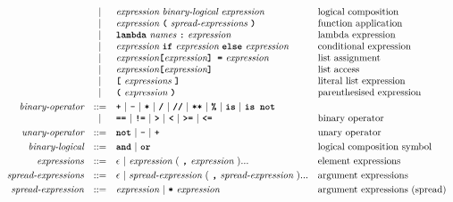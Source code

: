 \[\begin{array}{rcll}
                            & |   & \textit{expression}\ \textit{binary-logical}\ \textit{expression}                        & \text{logical composition}              \\
                            & |   & \textit{expression}\ \textbf{\texttt{(}}\ \textit{spread-expressions}\ \textbf{\texttt{)}}                     & \text{function application}             \\
                            & |   & \textbf{\texttt{lambda}}\ \textit{names}\ \textbf{\texttt{:}}\ \textit{expression}         & \text{lambda expression}                \\
                            & |   & \textit{expression}\ \textbf{\texttt{if}}\ \textit{expression}\ \textbf{\texttt{else}}\ \textit{expression}    & \text{conditional expression}           \\
                            & |   & \textit{expression}\textbf{\texttt{[}}\textit{expression}\textbf{\texttt{] =}}\ \textit{expression}            & \text{list assignment}                  \\
                            & |   & \textit{expression}\textbf{\texttt{[}}\textit{expression}\textbf{\texttt{]}}                                   & \text{list access}                      \\
                            & |   & \textbf{\texttt{[}}\ \textit{expressions}\ \textbf{\texttt{]}}                                                 & \text{literal list expression}          \\
                            & |   & \textbf{\texttt{(}}\ \textit{expression}\ \textbf{\texttt{)}}                                                  & \text{parenthesised expression}         \\[1mm]
\textit{binary-operator}    & ::= & \textbf{\texttt{+}}\ |\ \textbf{\texttt{-}}\ |\ \textbf{\texttt{*}}\ |\ \textbf{\texttt{/}}\ |\ \textbf{\texttt{//}}\ |\ \textbf{\texttt{**}}\ |\ \textbf{\texttt{\%}}\ |\ \textbf{\texttt{is}}\ |\ \textbf{\texttt{is not}} &                                         \\
                            & |   & \textbf{\texttt{==}}\ |\ \textbf{\texttt{!=}}\ |\ \textbf{\texttt{>}}\ |\ \textbf{\texttt{<}}\ |\ \textbf{\texttt{>=}}\ |\ \textbf{\texttt{<=}}            & \text{binary operator}                  \\[1mm]
\textit{unary-operator}     & ::= & \textbf{\texttt{not}}\ |\ \textbf{\texttt{-}}\ |\ \textbf{\texttt{+}}                                                     & \text{unary operator}                   \\[1mm]
\textit{binary-logical}     & ::= & \textbf{\texttt{and}}\ |\ \textbf{\texttt{or}}                                                                 & \text{logical composition symbol}       \\[1mm]
\textit{expressions}        & ::= & \epsilon\ |\ \textit{expression}\ (\ \textbf{\texttt{,}}\ \textit{expression}\ )...                 & \text{element expressions}              \\[1mm]
\textit{spread-expressions} & ::= & \epsilon\ |\ \textit{spread-expression}\ (\ \textbf{\texttt{,}}\ \textit{spread-expression}\ )...   & \text{argument expressions}             \\[1mm]
\textit{spread-expression}  & ::= & \textit{expression}\ |\ \textbf{\texttt{*}}\ \textit{expression}                                    & \text{argument expressions (spread)}    \\
\end{array}\]


